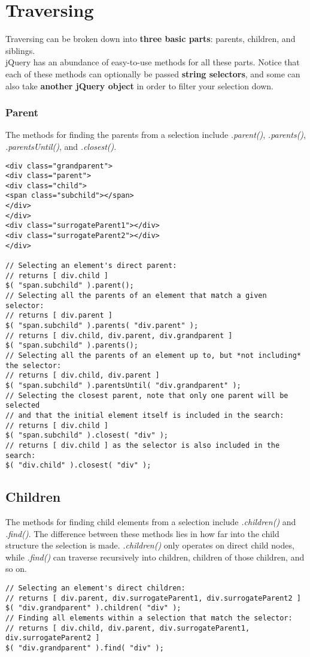 \documentclass[10pt,letterpaper]{book}
\begin{document}
\section{Traversing}
Traversing can be broken down into \textbf{three basic parts}: parents, children, and siblings.\\
jQuery has an abundance of easy-to-use methods for all these parts. Notice that each of these methods can optionally be passed \textbf{string selectors}, and some can also take \textbf{another jQuery object} in order to filter your selection down.
\subsubsection{Parent}
The methods for finding the parents from a selection include \textit{.parent()}, \textit{.parents()}, \textit{.parentsUntil()}, and \textit{.closest()}.
\begin{lstlisting}
<div class="grandparent">
<div class="parent">
<div class="child">
<span class="subchild"></span>
</div>
</div>
<div class="surrogateParent1"></div>
<div class="surrogateParent2"></div>
</div>

// Selecting an element's direct parent:
// returns [ div.child ]
$( "span.subchild" ).parent();
// Selecting all the parents of an element that match a given selector:
// returns [ div.parent ]
$( "span.subchild" ).parents( "div.parent" );
// returns [ div.child, div.parent, div.grandparent ]
$( "span.subchild" ).parents();
// Selecting all the parents of an element up to, but *not including* the selector:
// returns [ div.child, div.parent ]
$( "span.subchild" ).parentsUntil( "div.grandparent" );
// Selecting the closest parent, note that only one parent will be selected
// and that the initial element itself is included in the search:
// returns [ div.child ]
$( "span.subchild" ).closest( "div" );
// returns [ div.child ] as the selector is also included in the search:
$( "div.child" ).closest( "div" );
\end{lstlisting}
\subsection{Children}
The methods for finding child elements from a selection include \textit{.children()} and \textit{.find()}. The difference between these methods lies in how far into the child structure the selection is made. \textit{.children()} only operates on direct child nodes, while \textit{.find()} can traverse recursively into children, children of those children, and so on.
\begin{lstlisting}
// Selecting an element's direct children:
// returns [ div.parent, div.surrogateParent1, div.surrogateParent2 ]
$( "div.grandparent" ).children( "div" );
// Finding all elements within a selection that match the selector:
// returns [ div.child, div.parent, div.surrogateParent1, div.surrogateParent2 ]
$( "div.grandparent" ).find( "div" );
\end{lstlisting}
\end{document}
